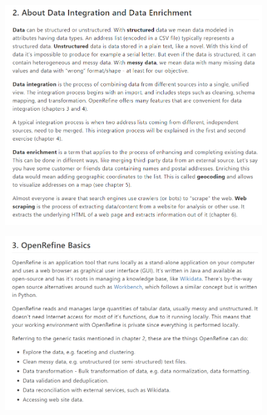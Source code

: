 \begin{figure}[H]
    \includegraphics[width=\linewidth]{./Figures/Appendices/worksheet/4.png}
\end{figure}
\begin{figure}[H]
    \includegraphics[width=\linewidth]{./Figures/Appendices/worksheet/5.png}
\end{figure}
